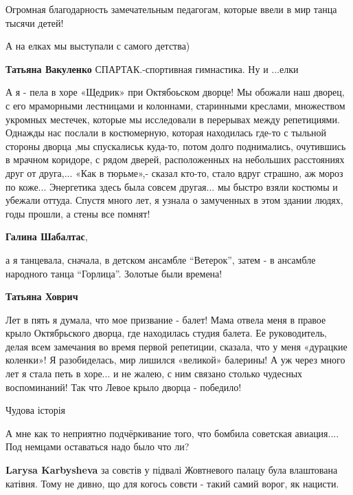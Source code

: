 \begin{itemize}
Огромная благодарность замечательным педагогам, которые ввели в мир танца тысячи детей!

А на елках мы выступали с самого детства)

\textbf{Татьяна Вакуленко} СПАРТАК.-спортивная гимнастика. Ну и ...елки


А я - пела в хоре «Щедрик» при Октябоьском дворце! Мы обожали наш дворец, с его
мраморными лестницами и колоннами, старинными креслами, множеством укромных
местечек, которые мы исследовали в перерывах между репетициями. Однажды нас
послали в костюмерную, которая находилась где-то с тыльной стороны дворца ,мы
спускалиськ куда-то, потом долго поднимались, очутившись в мрачном коридоре, с
рядом дверей, расположенных на небольших расстояниях друг от друга,... «Как в
тюрьме»,- сказал кто-то, стало вдруг страшно, аж мороз по коже... Энергетика
здесь была совсем другая... мы быстро взяли костюмы и убежали оттуда. Спустя много
лет, я узнала о замученных в этом здании людях, годы прошли, а стены все
помнят!

\begin{itemize} %
\textbf{Галина Шабалтас}, 

а я танцевала, сначала, в детском ансамбле \enquote{Ветерок}, затем - в ансамбле
народного танца \enquote{Горлица}. Золотые были времена!


\textbf{Татьяна Ховрич} 

Лет в пять я думала, что мое призвание - балет! Мама отвела меня в правое крыло
Октябрьского дворца, где находилась студия балета. Ее руководитель, делая всем
замечания во время первой репетиции, сказала, что у меня «дурацкие коленки»! Я
разобиделась, мир лишился «великой» балерины! А уж через много лет я стала петь
в хоре... и не жалею, с ним связано столько чудесных воспоминаний! Так что Левое
крыло дворца - победило!

\end{itemize} %

Чудова історія


А мне как то неприятно подчёркивание того, что бомбила советская авиация.... Под
немцами оставаться надо было что ли?

\begin{itemize} %
\textbf{Larysa Karbysheva} за совєтів у підвалі Жовтневого палацу була влаштована катівня. Тому не дивно, що для когось совєти - такий самий ворог, як нацисти.


\end{itemize}
\end{itemize}
